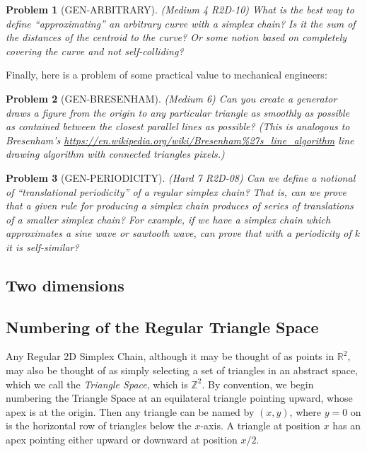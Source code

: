 \documentclass[11pt]{article}
\newtheorem{problem}{Problem}
\begin{document}
\begin{problem}[GEN-ARBITRARY]
(Medium 4 R2D-10) What is the best way to define ``approximating'' an arbitrary  curve with a simplex chain? Is it the sum of the distances of the centroid to the curve?
  Or some notion based on completely covering the curve and not self-colliding?  
\end{problem}

Finally, here is a problem of some practical value to mechanical engineers:
\begin{problem}[GEN-BRESENHAM]
  (Medium 6) Can you create a generator draws a figure from the origin to any particular triangle as smoothly as possible as contained
  between the closest parallel lines as possible? (This is analogous to Bresenham's \url{https://en.wikipedia.org/wiki/Bresenham%27s_line_algorithm}
    line drawing algorithm with connected triangles pixels.)
\end{problem}

\begin{problem}[GEN-PERIODICITY]
(Hard 7 R2D-08) Can we define a notional of ``translational periodicity'' of a regular simplex chain? That is, can we prove that
  a given rule for producing a simplex chain produces of series of translations of a smaller simplex chain? For example,
  if we have a simplex chain which approximates a sine wave or sawtooth wave, can prove that with a periodicity of $k$ it
  is self-similar?  
\end{problem}

\subsection{Two dimensions}

\subsection{Numbering of the Regular Triangle Space}

Any Regular 2D Simplex Chain, although it may be thought of as points in $\mathbb{R}^2$, may also be thought of as simply
selecting a set of triangles in an abstract space, which we call the {\em Triangle Space}, which is $\mathbb{Z}^2$. By convention,
we begin numbering the Triangle Space at an equilateral triangle pointing upward, whose apex is at the origin.  Then any triangle can be
named by $(x,y)$, where $y=0$ on is the horizontal row of triangles below the $x$-axis. A triangle at position $x$ has an apex
pointing either upward or downward at position $x/2$.
\end{document}

